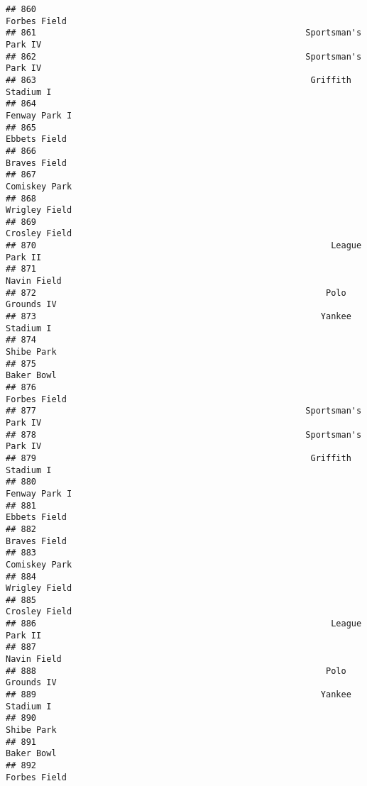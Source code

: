 \documentclass[]{article}
\begin{document}
\begin{verbatim}
## 860                                                            Forbes Field
## 861                                                     Sportsman's Park IV
## 862                                                     Sportsman's Park IV
## 863                                                      Griffith Stadium I
## 864                                                           Fenway Park I
## 865                                                            Ebbets Field
## 866                                                            Braves Field
## 867                                                           Comiskey Park
## 868                                                           Wrigley Field
## 869                                                           Crosley Field
## 870                                                          League Park II
## 871                                                             Navin Field
## 872                                                         Polo Grounds IV
## 873                                                        Yankee Stadium I
## 874                                                              Shibe Park
## 875                                                              Baker Bowl
## 876                                                            Forbes Field
## 877                                                     Sportsman's Park IV
## 878                                                     Sportsman's Park IV
## 879                                                      Griffith Stadium I
## 880                                                           Fenway Park I
## 881                                                            Ebbets Field
## 882                                                            Braves Field
## 883                                                           Comiskey Park
## 884                                                           Wrigley Field
## 885                                                           Crosley Field
## 886                                                          League Park II
## 887                                                             Navin Field
## 888                                                         Polo Grounds IV
## 889                                                        Yankee Stadium I
## 890                                                              Shibe Park
## 891                                                              Baker Bowl
## 892                                                            Forbes Field

\end{verbatim}
\end{document}
